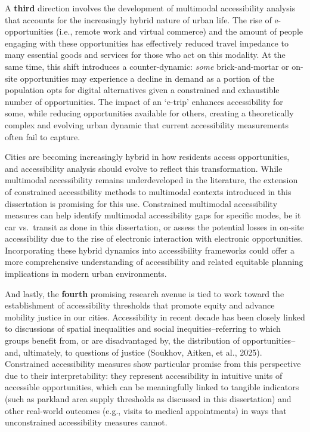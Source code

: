 \documentclass[
11pt, %
oneside, %
english, %
singlespacing, %
]{macthesis} %
\begin{document}
A \textbf{third} direction involves the development of multimodal accessibility analysis that accounts for the increasingly hybrid nature of urban life. The rise of e-opportunities (i.e., remote work and virtual commerce) and the amount of people engaging with these opportunities has effectively reduced travel impedance to many essential goods and services for those who act on this modality. At the same time, this shift introduces a counter-dynamic: \emph{some} brick-and-mortar or on-site opportunities may experience a decline in demand as a portion of the population opts for digital alternatives given a constrained and exhaustible number of opportunities. The impact of an `e-trip' enhances accessibility for some, while reducing opportunities available for others, creating a theoretically complex and evolving urban dynamic that current accessibility measurements often fail to capture.

Cities are becoming increasingly hybrid in how residents access opportunities, and accessibility analysis should evolve to reflect this transformation. While multimodal accessibility remains underdeveloped in the literature, the extension of constrained accessibility methods to multimodal contexts introduced in this dissertation is promising for this use. Constrained multimodal accessibility measures can help identify multimodal accessibility gaps for specific modes, be it car vs.~transit as done in this dissertation, or assess the potential losses in on-site accessibility due to the rise of electronic interaction with electronic opportunities. Incorporating these hybrid dynamics into accessibility frameworks could offer a more comprehensive understanding of accessibility and related equitable planning implications in modern urban environments.

And lastly, the \textbf{fourth} promising research avenue is tied to work toward the establishment of accessibility thresholds that promote equity and advance mobility justice in our cities. Accessibility in recent decade has been closely linked to discussions of spatial inequalities and social inequities--referring to which groups benefit from, or are disadvantaged by, the distribution of opportunities--and, ultimately, to questions of justice (Soukhov, Aitken, et al., 2025). Constrained accessibility measures show particular promise from this perspective due to their interpretability: they represent accessibility in intuitive units of accessible opportunities, which can be meaningfully linked to tangible indicators (such as parkland area supply thresholds as discussed in this dissertation) and other real-world outcomes (e.g., visits to medical appointments) in ways that unconstrained accessibility measures cannot.
\end{document}
